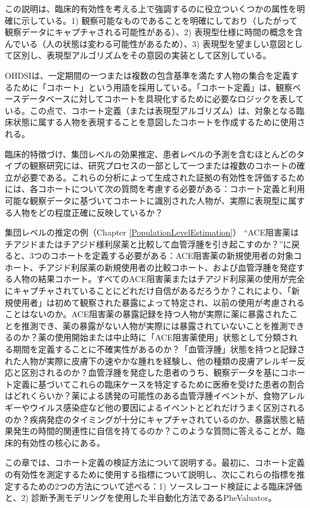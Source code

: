 \documentclass[
  11pt]{book}
\theoremstyle{definition}
\theoremstyle{definition}
\theoremstyle{definition}
\theoremstyle{definition}
\theoremstyle{remark}
\begin{document}
この説明は、臨床的有効性を考える上で強調するのに役立ついくつかの属性を明確に示している。1) 観察可能なものであることを明確にしており（したがって観察データにキャプチャされる可能性がある）、2) 表現型仕様に時間の概念を含んでいる（人の状態は変わる可能性があるため）、3) 表現型を望ましい意図として区別し、表現型アルゴリズムをその意図の実装として区別している。

OHDSIは、一定期間の一つまたは複数の包含基準を満たす人物の集合を定義するために「コホート」という用語を採用している。「コホート定義」は、観察ベースデータベースに対してコホートを具現化するために必要なロジックを表している。この点で、コホート定義（または表現型アルゴリズム）は、対象となる臨床状態に属する人物を表現することを意図したコホートを作成するために使用される。

臨床的特徴づけ、集団レベルの効果推定、患者レベルの予測を含むほとんどのタイプの観察研究には、研究プロセスの一部として一つまたは複数のコホートの確立が必要である。これらの分析によって生成された証拠の有効性を評価するためには、各コホートについて次の質問を考慮する必要がある：コホート定義と利用可能な観察データに基づいてコホートに識別された人物が、実際に表現型に属する人物をどの程度正確に反映しているか？

集団レベルの推定の例（Chapter \ref{PopulationLevelEstimation}） ``ACE阻害薬はチアジドまたはチアジド様利尿薬と比較して血管浮腫を引き起こすのか？''に戻ると、3つのコホートを定義する必要がある：ACE阻害薬の新規使用者の対象コホート、チアジド利尿薬の新規使用者の比較コホート、および血管浮腫を発症する人物の結果コホート。すべてのACE阻害薬またはチアジド利尿薬の使用が完全にキャプチャされていることにどれだけ自信があるだろうか？これにより、「新規使用者」は初めて観察された暴露によって特定され、以前の使用が考慮されることはないのか。ACE阻害薬の暴露記録を持つ人物が実際に薬に暴露されたことを推測でき、薬の暴露がない人物が実際には暴露されていないことを推測できるのか？薬の使用開始または中止時に「ACE阻害薬使用」状態として分類される期間を定義することに不確実性があるのか？「血管浮腫」状態を持つと記録された人物が実際に皮膚下の速やかな腫れを経験し、他の種類の皮膚アレルギー反応と区別されるのか？血管浮腫を発症した患者のうち、観察データを基にコホート定義に基づいてこれらの臨床ケースを特定するために医療を受けた患者の割合はどれくらいか？薬による誘発の可能性のある血管浮腫イベントが、食物アレルギーやウイルス感染症など他の要因によるイベントとどれだけうまく区別されるのか？疾病発症のタイミングが十分にキャプチャされているのか、暴露状態と結果発生の時間的関連性に自信を持てるのか？このような質問に答えることが、臨床的有効性の核心にある。

この章では、コホート定義の検証方法について説明する。最初に、コホート定義の有効性を測定するために使用する指標について説明し、次にこれらの指標を推定するための2つの方法について述べる：1) ソースレコード検証による臨床評価と、2) 診断予測モデリングを使用した半自動化方法であるPheValuator。
\end{document}
